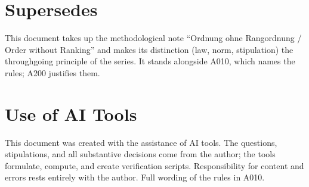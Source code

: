 \section{Supersedes}

This document takes up the methodological note ``Ordnung ohne Rangordnung / Order
without Ranking'' and makes its distinction (law, norm, stipulation) the
throughgoing principle of the series. It stands alongside A010, which names the
rules; A200 justifies them.

\section{Use of AI Tools}

This document was created with the assistance of AI tools. The questions,
stipulations, and all substantive decisions come from the author; the tools
formulate, compute, and create verification scripts.
Responsibility for content and errors rests entirely with the author.
Full wording of the rules in A010.
